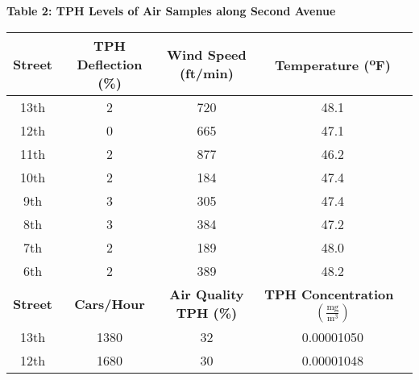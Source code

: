 \begin{center}
{\large {\bf Table 2: TPH Levels of Air Samples along Second Avenue\\}}
\vspace{2mm}
\begin{tabular}{|cccc|}
    \hline
    \textbf{Street} & \textbf{TPH Deflection (\%)} & \textbf{Wind Speed (ft/min)} & \textbf{Temperature (\textsuperscript{o}F)}                           \\\hline
    13th            & 2                            & 720                          & 48.1                                                                  \\
    12th            & 0                            & 665                          & 47.1                                                                  \\
    11th            & 2                            & 877                          & 46.2                                                                  \\
    10th            & 2                            & 184                          & 47.4                                                                  \\
    9th             & 3                            & 305                          & 47.4                                                                  \\
    8th             & 3                            & 384                          & 47.2                                                                  \\
    7th             & 2                            & 189                          & 48.0                                                                  \\
    6th             & 2                            & 389                          & 48.2                                                                  \\\hline\hline
    \textbf{Street} & \textbf{Cars/Hour}           & \textbf{Air Quality TPH (\%)}    & \textbf{TPH Concentration~}$\left(\frac{\text{mg}}{\text{m}^3}\right)$  \\\hline
    13th            & 1380                         & 32                           & 0.00001050                                                            \\
    12th            & 1680                         & 30                           & 0.00001048                                                            \\

\end{tabular}
\end{center}
